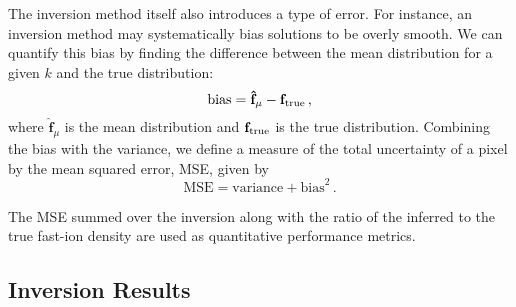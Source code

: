 The inversion method itself also introduces a type of error. For instance, an inversion method may systematically bias solutions to be overly smooth. We can quantify this bias by finding the difference between the mean distribution for a given $k$ and the true distribution:
\begin{equation}\label{eq:bias}
    \mathrm{bias} = \mathbf{\hat{f}}_\mu - \mathbf{f}_{\rm{true}} \, , 
\end{equation}
where $\mathbf{\hat{f}}_\mu$ is the mean distribution and $\mathbf{f}_{\rm{true}}$ is the true distribution. 
Combining the bias with the variance, we define a measure of the total uncertainty of a pixel by the mean squared error, MSE, given by
\begin{equation}\label{eq:MSE}
    \mathrm{MSE} = \mathrm{variance} + \mathrm{bias}^2 \, .
\end{equation}

The MSE summed over the inversion along with the ratio of the inferred to the true fast-ion density are used as quantitative performance metrics.

\subsection{Inversion Results}
